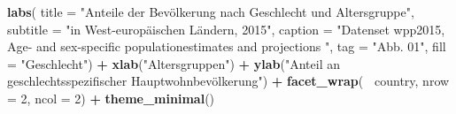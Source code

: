 \documentclass[
]{article}
\newenvironment{Shaded}{\begin{snugshade}}{\end{snugshade}}
\newcommand{\DataTypeTok}[1]{\textcolor[rgb]{0.13,0.29,0.53}{#1}}
\newcommand{\DecValTok}[1]{\textcolor[rgb]{0.00,0.00,0.81}{#1}}
\newcommand{\KeywordTok}[1]{\textcolor[rgb]{0.13,0.29,0.53}{\textbf{#1}}}
\newcommand{\NormalTok}[1]{#1}
\newcommand{\OperatorTok}[1]{\textcolor[rgb]{0.81,0.36,0.00}{\textbf{#1}}}
\newcommand{\StringTok}[1]{\textcolor[rgb]{0.31,0.60,0.02}{#1}}
\begin{document}
\begin{Shaded}
\begin{Highlighting}[]
{{{{{{{{{\StringTok{    }\KeywordTok{labs}\NormalTok{(}
      \DataTypeTok{title =} \StringTok{"Anteile der Bevölkerung nach Geschlecht und Altersgruppe"}\NormalTok{,}
      \DataTypeTok{subtitle =} \StringTok{"in West-europäischen Ländern, 2015"}\NormalTok{,}
      \DataTypeTok{caption =} \StringTok{"Datenset wpp2015, Age- and sex-specific populationestimates and projections "}\NormalTok{,}
      \DataTypeTok{tag =} \StringTok{"Abb. 01"}\NormalTok{,}
      \DataTypeTok{fill =} \StringTok{"Geschlecht"}\NormalTok{) }\OperatorTok{+}
\StringTok{    }\KeywordTok{xlab}\NormalTok{(}\StringTok{"Altersgruppen"}\NormalTok{) }\OperatorTok{+}
\StringTok{    }\KeywordTok{ylab}\NormalTok{(}\StringTok{"Anteil an geschlechtsspezifischer Hauptwohnbevölkerung"}\NormalTok{) }\OperatorTok{+}
\StringTok{  }\KeywordTok{facet_wrap}\NormalTok{(}\OperatorTok{~}\StringTok{ }\NormalTok{country, }\DataTypeTok{nrow =} \DecValTok{2}\NormalTok{, }\DataTypeTok{ncol =} \DecValTok{2}\NormalTok{) }\OperatorTok{+}
\StringTok{  }\KeywordTok{theme_minimal}\NormalTok{()}


}}}}}}}}}
\end{Highlighting}
\end{Shaded}
\end{document}
